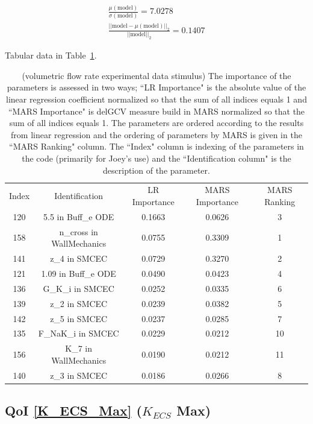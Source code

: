 \documentclass[12pt]{article}
\numberwithin{equation}{section}
\begin{document}
\begin{eqnarray*}
\frac{\mu(\text{model})}{\sigma(\text{model})} = 7.0278\\
\frac{\vert \vert \text{model}-\mu(\text{model}) \vert \vert_2 }{\vert \vert \text{model}\vert \vert_2 } = 0.1407
\end{eqnarray*}

Tabular data in Table~\ref{qoi_vol_flow_ex}.

\begin{table}[h]
\centering
\begin{tabular}{ccccc}
Index & Identification & LR Importance & MARS Importance & MARS Ranking \\
   120 & 5.5 in Buff\_e ODE & 0.1663 & 0.0626 & 3\\
   158 & n\_cross in WallMechanics  & 0.0755 & 0.3309 & 1\\
   141 & z\_4 in SMCEC & 0.0729 & 0.3270 & 2\\
   121 & 1.09 in Buff\_e ODE & 0.0490 & 0.0423 & 4\\
   136 & G\_K\_i in SMCEC & 0.0252 & 0.0335 & 6\\
   139 & z\_2 in SMCEC & 0.0239 & 0.0382 & 5\\
   142 & z\_5 in SMCEC & 0.0237 & 0.0285 & 7\\
   135 & F\_NaK\_i in SMCEC & 0.0229 & 0.0212 & 10\\
   156 & K\_7 in WallMechanics & 0.0190 & 0.0212 & 11\\
   140 & z\_3 in SMCEC & 0.0186 & 0.0266 & 8\\
\end{tabular}
\caption{(volumetric flow rate experimental data stimulus) The importance of the parameters is assessed in two ways; ``LR Importance" is the absolute value of the linear regression coefficient normalized so that the sum of all indices equals 1 and ``MARS Importance" is delGCV measure build in MARS normalized so that the sum of all indices equals 1. The parameters are ordered according to the results from linear regression and the ordering of parameters by MARS is given in the ``MARS Ranking" column. The ``Index" column is indexing of the parameters in the code (primarily for Joey's use) and the ``Identification column" is the description of the parameter.}
\label{qoi_vol_flow_ex}
\end{table}

\newpage

\subsection{QoI \eqref{K_ECS_Max} ($K_{ECS}$ Max)}
\end{document}
